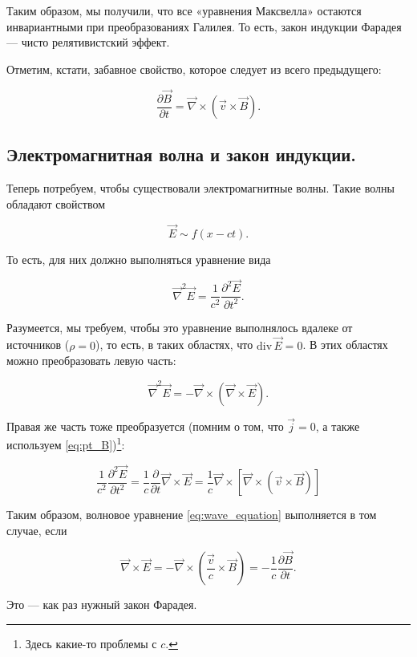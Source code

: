 \documentclass[12pt]{article}
\newcommand{\pt}{\partial}
\renewcommand{\div}{\mathrm{div}\,}
\newcommand{\vn}{\vec{\nabla}}
\begin{document}
Таким образом, мы получили, что все «уравнения Максвелла» остаются
инвариантными при преобразованиях Галилея. То есть, закон индукции
Фарадея — чисто релятивистский эффект. 

Отметим, кстати, забавное свойство, которое следует из всего
предыдущего: 

\begin{equation}
  \label{eq:pt_B}
  \frac{\pt \vec{B}}{\pt t} = \vn \times (\vec{v} \times \vec{B}).
\end{equation}

\subsection{Электромагнитная волна и закон индукции.}
\label{em_wave}

Теперь потребуем, чтобы существовали электромагнитные волны. Такие
волны обладают свойством 

\begin{equation}
  \vec{E} \sim f (x-ct).
\end{equation}

То есть, для них должно выполняться уравнение вида

\begin{equation}
  \label{eq:wave_equation}
  \vn^2 \vec{E}  = \frac{1}{c^2}
  \frac{\pt^2\vec{E}}{\pt t^2}.
\end{equation}

Разумеется, мы требуем, чтобы это уравнение выполнялось вдалеке от
источников ($\rho=0$), то есть, в таких областях, что $\div \vec{E} = 0$. В этих
областях можно преобразовать левую часть: 

\begin{equation}
  \vn^2 \vec{E} = - \vn \times (\vn \times \vec{E}).
\end{equation}

Правая же часть тоже преобразуется (помним о том, что $\vec{j}=0$, а
также используем \eqref{eq:pt_B})\footnote{Здесь какие-то проблемы с $c$.}:

\begin{equation}
  \frac{1}{c^2}  \frac{\pt^2\vec{E}}{\pt t^2} = \frac{1}{c}
  \frac{\pt}{\pt t} \vn \times \vec{E} = \frac{1}{c} \vn \times \left[
    \vn \times \left( \vec{v} \times \vec{B} \right) \right]
\end{equation}

Таким образом, волновое уравнение \eqref{eq:wave_equation} выполняется
в том случае, если

\begin{equation}
  \vn \times \vec{E} = -\vn \times \left( \frac{\vec{v}}{c} \times
    \vec{B} \right) = -\frac{1}{c} \frac{\pt \vec{B}}{\pt t}. 
\end{equation}

Это — как раз нужный закон Фарадея. 
\end{document}
